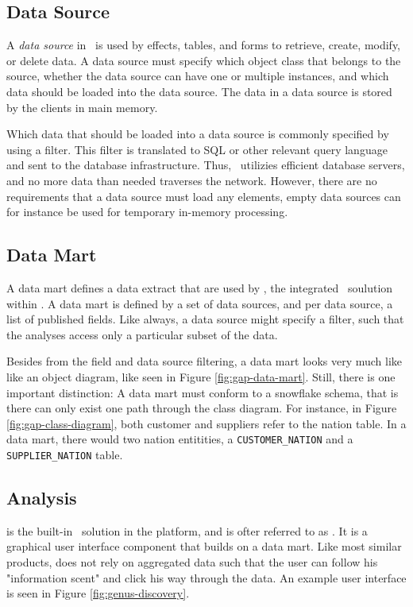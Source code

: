 \subsection{Data Source}
\label{sub:Data Source}
A \textit{data source} in \gap~is used by effects, tables, and forms to retrieve, create, modify, or delete data. A data source must specify which object class that belongs to the source, whether the data source can have one or multiple instances, and which data should be loaded into the data source. The data in a data source is stored by the clients in main memory. 

Which data that should be loaded into a data source is commonly specified by using a filter. This filter is translated to SQL or other relevant query language and sent to the database infrastructure. Thus, \gap~utilizies efficient database servers, and no more data than needed traverses the network. However, there are no requirements that a data source must load any elements, empty data sources can for instance be used for temporary in-memory processing. 

\subsection{Data Mart}
\label{sub:Data Mart}
A data mart defines a data extract that are used by , the integrated \bd~soulution within \gap. A data mart is defined by a set of data sources, and per data source, a list of published fields. Like always, a data source might specify a filter, such that the analyses access only a particular subset of the data.

Besides from the field and data source filtering, a data mart looks very much like like an object diagram, like seen in Figure \ref{fig:gap-data-mart}. Still, there is one important distinction: A data mart must conform to a snowflake schema, that is there can only exist one path through the class diagram. For instance, in Figure \ref{fig:gap-class-diagram}, both customer and suppliers refer to the nation table. In a data mart, there would two nation entitities, a \texttt{CUSTOMER\_NATION} and a \texttt{SUPPLIER\_NATION} table.

\subsection{Analysis}
\label{sub:Analysis}
 is the built-in \bd~solution in the platform, and is ofter referred to as . It is a graphical user interface component that builds on a data mart. Like most similar products,  does not rely on aggregated data such that the user can follow his "information scent" and click his way through the data. An example user interface is seen in Figure \ref{fig:genus-discovery}.

